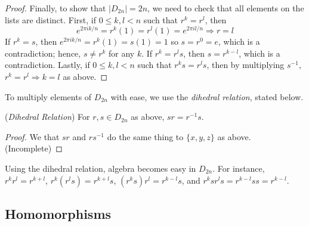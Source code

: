 \documentclass[10pt, a4paper, twoside]{report}
\begin{document}
\begin{proof}
    Finally, to show that \(|D_{2n}|=2n\), we need to check that all elements on the lists are distinct. First, if \(0\leq k,l< n\) such that \(r^k=r^l\), then 
    \[e^{2\pi ik/n}=r^k(1)=r^l(1)=e^{2\pi il/n}\Rightarrow r=l\]
    If \(r^k=s\), then \(e^{2\pi ik/n}=r^k(1)=s(1)=1\) so \(s=r^0=e\), which is a contradiction; hence, \(s\neq r^k\) for any \(k\). If \(r^k=r^ls\), then \(s=r^{k-l}\), which is a contradiction. Lastly, if \(0\leq k,l<n\) such that \(r^ks=r^ls\), then by multiplying \(s^{-1}\), \(r^k=r^l\Rightarrow k=l\) as above.
\end{proof}
To multiply elements of \(D_{2n}\) with ease, we use the \emph{dihedral relation}, stated below.
\begin{lemma}
    (\emph{Dihedral Relation}) For \(r,s\in D_{2n}\) as above, \(sr=r^{-1}s\).
\end{lemma}
\begin{proof}
    We that \(sr\) and \(rs^{-1}\) do the same thing to \(\{x,y,z\}\) as above. (Incomplete)
\end{proof}
Using the dihedral relation, algebra becomes easy in \(D_{2n}\). For instance, \(r^kr^l=r^{k+l}\), \(r^k(r^ls)=r^{k+l}s\), \((r^ks)r^l=r^{k-l}s\), and \(r^ksr^ls=r^{k-l}ss=r^{k-l}\).
\subsection{Homomorphisms}
\end{document}
